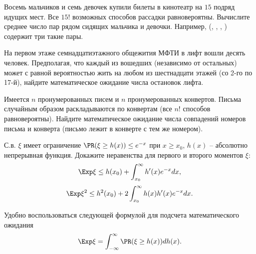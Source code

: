 \begin{problem}
Восемь мальчиков и семь девочек купили билеты в кинотеатр на $15$ подряд идущих мест. Все $15!$ возможных способов рассадки равновероятны. Вычислите среднее число пар рядом сидящих мальчика и девочки. Например, (\mars, \female, \mars, \female) содержит три такие пары. 
\end{problem}


\begin{problem}
На первом этаже семнадцатиэтажного общежития МФТИ в лифт вошли десять человек. Предполагая, что каждый из вошедших (независимо от остальных) может с равной вероятностью жить на любом из шестнадцати этажей (со 2-го по 17-й), найдите математическое ожидание числа остановок лифта.
\end{problem}



\begin{problem}
\label{sec:latters}
Имеется $n$ пронумерованных писем и $n$ пронумерованных конвертов. Письма случайным образом раскладываются по конвертам (все $n!$ 
способов равновероятны). 
Найдите математическое ожидание числа совпадений номеров письма и конверта (письмо лежит в конверте с тем же номером). 
\end{problem}

\begin{problem}
\label{mom_ineq}
С.в. $\xi$ имеет ограничение $\PR(\xi \geq h(x)) \leq e^{-x}$ при $x \geq x_0$, $h(x)$ -- абсолютно непрерывная функция. Докажите неравенства для первого и второго моментов $\xi$:
\[
\Exp \xi \leq h(x_0) + \int_{x_0}^{\infty}h'(x)e^{-x}dx,
\]
\[
\Exp \xi^2 \leq h^2(x_0) +  2\int_{x_0}^{\infty}h(x) h'(x)e^{-x}dx.
\]
\end{problem}

\begin{ordre}
Удобно воспользоваться следующей формулой для подсчета математического ожидания 
\[
\Exp \xi = \int_{-\infty}^{\infty} \PR(\xi \geq h(x)) d h(x).
\]
\end{ordre}





